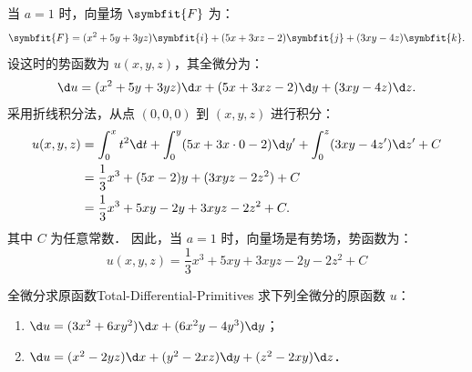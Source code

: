 \begin{solution}
    当 $a = 1$ 时，向量场 $\symbfit{F}$ 为：
    \begin{equation}
        \symbfit{F} = (x^2 + 5y + 3yz)\symbfit{i} + (5x + 3xz - 2)\symbfit{j} + (3xy - 4z)\symbfit{k}.
    \end{equation}
    设这时的势函数为 $u(x, y, z)$，其全微分为：
    \begin{equation}
        \d u = (x^2 + 5y + 3yz) \d x + (5x + 3xz - 2) \d y + (3xy - 4z) \d z.
    \end{equation}
    采用折线积分法，从点 $(0, 0, 0)$ 到 $(x, y, z)$ 进行积分：
    \begin{equation}
        \begin{aligned}
            u(x, y, z) & = \int_0^x t^2 \d t + \int_0^y (5x + 3x \cdot 0 - 2) \d y' + \int_0^z (3xy - 4z') \d z' + C \\
                       & = \frac{1}{3}x^3 + (5x - 2)y + (3xyz - 2z^2) + C                                            \\
                       & = \frac{1}{3}x^3 + 5xy - 2y + 3xyz - 2z^2 + C.
        \end{aligned}
    \end{equation}
    其中 $C$ 为任意常数．
    因此，当 $a=1$ 时，向量场是有势场，势函数为：
    \begin{equation}
        \boxed{u(x, y, z) = \frac{1}{3}x^3 + 5xy + 3xyz - 2y - 2z^2 + C}
    \end{equation}
\end{solution}

\begin{problem}{全微分求原函数}{Total-Differential-Primitives}
    求下列全微分的原函数 $u$：
    \begin{enumerate}
        \item $\d u = (3x^2 + 6xy^2) \d x + (6x^2y - 4y^3) \d y$；
        \item $\d u = (x^2 - 2yz) \d x + (y^2 - 2xz) \d y + (z^2 - 2xy) \d z$．
    \end{enumerate}
\end{problem}

